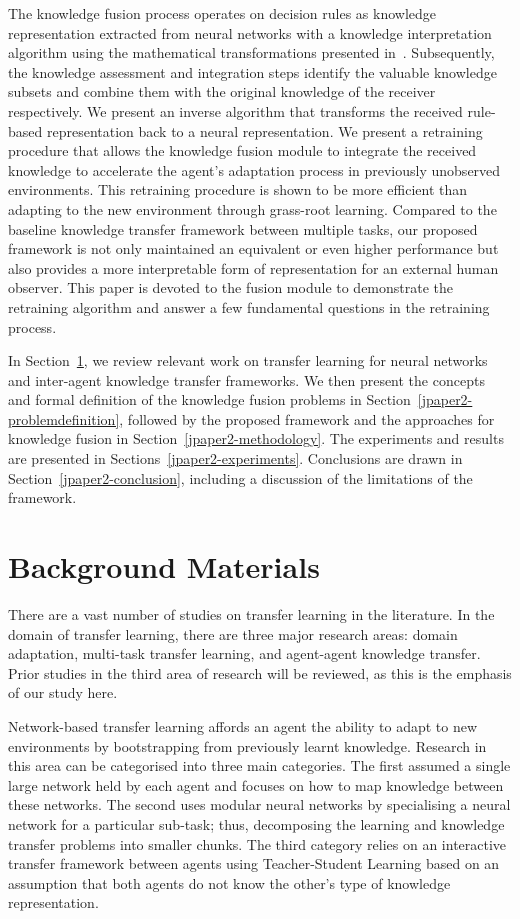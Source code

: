 \documentclass[lettersize,journal]{IEEEtran}
\begin{document}
The knowledge fusion process operates on decision rules as knowledge representation extracted from neural networks with a knowledge interpretation algorithm using the mathematical transformations presented in~\cite{nguyen2020towards}. Subsequently, the knowledge assessment and integration steps identify the valuable knowledge subsets and combine them with the original knowledge of the receiver respectively. We present an inverse algorithm that transforms the received rule-based representation back to a neural representation. We present a retraining procedure that allows the knowledge fusion module to integrate the received knowledge to accelerate the agent\textquoteright s adaptation process in previously unobserved environments. This retraining procedure is shown to be more efficient than adapting to the new environment through grass-root learning. Compared to the baseline knowledge transfer framework between multiple tasks, our proposed framework is not only maintained an equivalent or even higher performance but also provides a more interpretable form of representation for an external human observer. This paper is devoted to the fusion module to demonstrate the retraining algorithm and answer a few fundamental questions in the retraining process.

In Section~\ref{jpaper2-relatedwork}, we review relevant work on transfer learning for neural networks and inter-agent knowledge transfer frameworks. We then present the concepts and formal definition of the knowledge fusion problems in Section~\ref{jpaper2-problemdefinition}, followed by the proposed framework and the approaches for knowledge fusion in Section~\ref{jpaper2-methodology}. The experiments and results are presented in Sections~\ref{jpaper2-experiments}. Conclusions are drawn in Section~\ref{jpaper2-conclusion}, including a discussion of the limitations of the framework.

\section{Background Materials}\label{jpaper2-relatedwork}

There are a vast number of studies on transfer learning in the literature. In the domain of transfer learning, there are three major research areas: domain adaptation, multi-task transfer learning, and agent-agent knowledge transfer. Prior studies in the third area of research will be reviewed, as this is the emphasis of our study here.

Network-based transfer learning affords an agent the ability to adapt to new environments by bootstrapping from previously learnt knowledge. Research in this area can be categorised into three main categories. The first assumed a single large network held by each agent and focuses on how to map knowledge between these networks. The second uses modular neural networks by specialising a neural network for a particular sub-task; thus, decomposing the learning and knowledge transfer problems into smaller chunks. The third category relies on an interactive transfer framework between agents using Teacher-Student Learning based on an assumption that both agents do not know the other\textquoteright s type of knowledge representation. 
\end{document}
